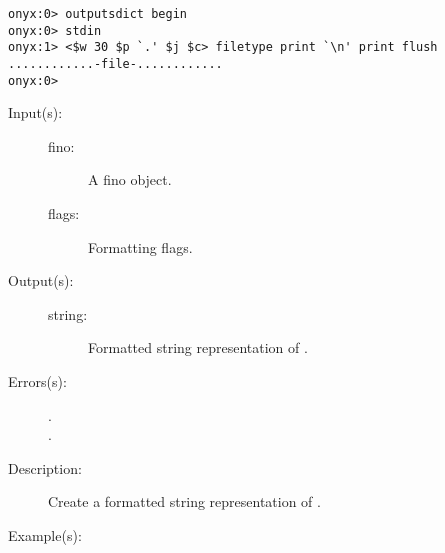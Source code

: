 \begin{description}
\begin{description}
\begin{verbatim}
onyx:0> outputsdict begin
onyx:0> stdin
onyx:1> <$w 30 $p `.' $j $c> filetype print `\n' print flush
............-file-............
onyx:0>
		\end{verbatim}
	\end{description}
\label{outputsdict:finotype}
\item[{\onyxop{fino flags}{finotype}{string}}: ]
	\begin{description}\item[]
	\item[Input(s): ]
		\begin{description}\item[]
		\item[fino: ]
			A fino object.
		\item[flags: ]
			Formatting flags.
		\end{description}
	\item[Output(s): ]
		\begin{description}\item[]
		\item[string: ]
			Formatted string representation of .
		\end{description}
	\item[Errors(s): ]
		\begin{description}\item[]
		\item[.]
		\item[.]
		\end{description}
	\item[Description: ]
		Create a formatted string representation of .
	\item[Example(s): ]\begin{verbatim}


\end{verbatim}
\end{description}
\end{description}
